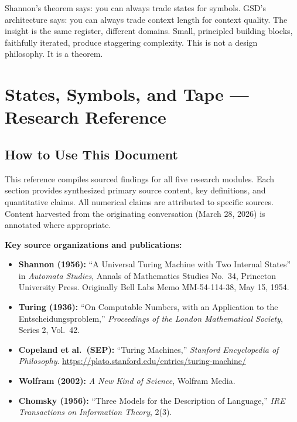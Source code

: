 \documentclass[11pt,letterpaper]{article}
\newcommand{\stageheader}[2]{%
  \noindent\colorbox{#2}{\makebox[\textwidth][l]{%
    \textcolor{white}{\bfseries\sffamily\hspace{6pt}#1\hspace{6pt}}}}%
  \vspace{0.5em}\par%
}
\begin{document}
Shannon's theorem says: you can always trade states for symbols. GSD's architecture says: you can always trade context length for context quality. The insight is the same register, different domains. Small, principled building blocks, faithfully iterated, produce staggering complexity. This is not a design philosophy. It is a theorem.

\newpage
\stageheader{STAGE 2 --- RESEARCH REFERENCE}{secondary}

\section{States, Symbols, and Tape --- Research Reference}

\subsection{How to Use This Document}

This reference compiles sourced findings for all five research modules. Each section provides synthesized primary source content, key definitions, and quantitative claims. All numerical claims are attributed to specific sources. Content harvested from the originating conversation (March 28, 2026) is annotated where appropriate.

\textbf{Key source organizations and publications:}
\begin{itemize}
  \item \textbf{Shannon (1956):} ``A Universal Turing Machine with Two Internal States'' in \textit{Automata Studies}, Annals of Mathematics Studies No.~34, Princeton University Press. Originally Bell Labs Memo MM-54-114-38, May 15, 1954.
  \item \textbf{Turing (1936):} ``On Computable Numbers, with an Application to the Entscheidungsproblem,'' \textit{Proceedings of the London Mathematical Society}, Series 2, Vol.~42.
  \item \textbf{Copeland et al.\ (SEP):} ``Turing Machines,'' \textit{Stanford Encyclopedia of Philosophy}. \url{https://plato.stanford.edu/entries/turing-machine/}
  \item \textbf{Wolfram (2002):} \textit{A New Kind of Science}, Wolfram Media.
  \item \textbf{Chomsky (1956):} ``Three Models for the Description of Language,'' \textit{IRE Transactions on Information Theory}, 2(3).
\end{itemize}
\end{document}
